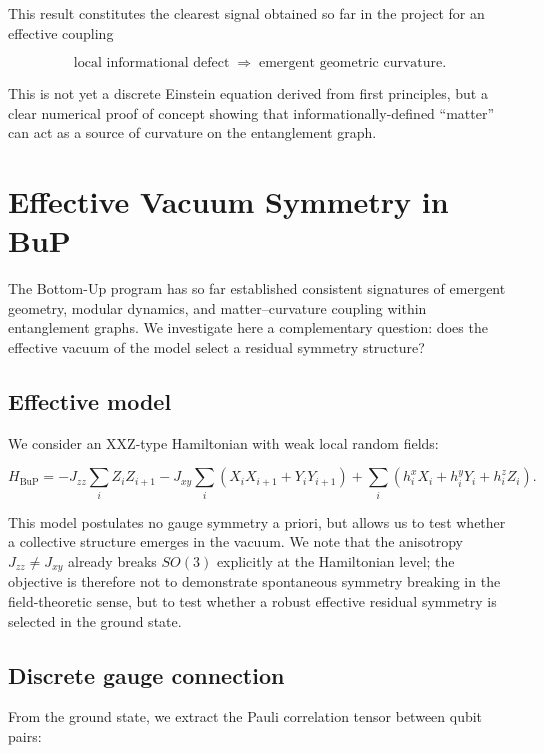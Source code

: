 \documentclass[11pt]{article}
\begin{document}
This result constitutes the clearest signal obtained so far in the
project for an effective coupling

\[
\text{local informational defect}
\;\Longrightarrow\;
\text{emergent geometric curvature}.
\]

This is not yet a discrete Einstein equation derived from first
principles, but a clear numerical proof of concept showing that
informationally-defined ``matter'' can act as a source of curvature
on the entanglement graph.


\section{Effective Vacuum Symmetry in BuP}

The Bottom-Up program has so far established consistent signatures
of emergent geometry, modular dynamics, and matter--curvature coupling
within entanglement graphs. We investigate here a complementary
question: does the effective vacuum of the model select a residual
symmetry structure?

\subsection{Effective model}

We consider an XXZ-type Hamiltonian with weak local random fields:

\[
H_{\mathrm{BuP}} =
- J_{zz}\sum_i Z_i Z_{i+1}
- J_{xy}\sum_i (X_iX_{i+1}+Y_iY_{i+1})
+ \sum_i (h_i^x X_i + h_i^y Y_i + h_i^z Z_i).
\]

This model postulates no gauge symmetry a priori, but allows us to
test whether a collective structure emerges in the vacuum.
We note that the anisotropy $J_{zz} \neq J_{xy}$ already breaks $SO(3)$
explicitly at the Hamiltonian level; the objective is therefore not
to demonstrate spontaneous symmetry breaking in the field-theoretic
sense, but to test whether a robust effective residual symmetry
is selected in the ground state.

\subsection{Discrete gauge connection}

From the ground state, we extract the Pauli correlation tensor
between qubit pairs:
\end{document}
